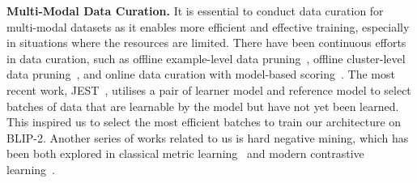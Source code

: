 \vspace{2pt}
\noindent \textbf{Multi-Modal Data Curation.} 
It is essential to conduct data curation for multi-modal datasets as it enables more efficient and effective training, especially in situations where the resources are limited.
There have been continuous efforts in data curation, such as offline example-level data pruning~\cite{gadre2024datacomp,kakaobrain2022coyo-700m,changpinyo2021conceptual,jia2021scaling,fang2023data,xu2023demystifying,hessel2021clipscore,mahmoud2024sieve}, offline cluster-level data pruning~\cite{abbas2023semdedup,abbas2024effective,sorscher2022beyond,campbell2018bayesian,har2004coresets}, and online data curation with model-based scoring~\cite{evans2023bad,lin2024rho,loshchilov2015online,mindermann2022prioritized}. 
The most recent work, JEST~\cite{evans2024data}, utilises a pair of learner model and reference model to select batches of data that are learnable by the model but have not yet been learned. This inspired us to select the most efficient batches to train our architecture on BLIP-2. Another series of works related to us is hard negative mining, which has been both explored in classical metric learning~\cite{bucher2016hard,harwood2017smart,mishchuk2017working,simo2015discriminative,wu2017sampling,xuan2020hard} and modern contrastive learning~\cite{robinson2020contrastive,tian2021divide}.




